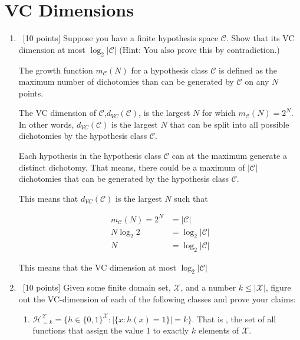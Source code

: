 \section{VC Dimensions}
\label{sec:vc-dimension}
\begin{enumerate}
\item ~[10 points] Suppose you have a finite hypothesis space
  $\mathcal{C}$. Show that its VC dimension at most
  $\log_2|\mathcal{C}|$ (Hint: You also prove this by contradiction.)

The growth function $m_\mathcal{C}(N)$ for a hypothesis class $\mathcal{C}$ is defined as the maximum number of dichotomies than can be generated by $\mathcal{C}$ on any $N$ points. 

The VC dimension of $\mathcal{C}$,$d_{VC}(\mathcal{C})$, is the largest $N$ for which $m_\mathcal{C}(N)=2^N$. In other words, $d_{VC}(\mathcal{C})$ is the largest $N$ that can be split into all possible dichotomies by the hypothesis class $\mathcal{C}$.

Each hypothesis in the hypothesis class $\mathcal{C}$ can at the maximum generate a distinct dichotomy. That means, there could be a maximum of $\left | \mathcal{C} \right| $ dichotomies that can be generated by the hypothesis class $\mathcal{C}$.

This means that $d_{VC}(\mathcal{C})$ is the largest $N$ such that 

\begin{equation*}
\begin{aligned}
m_\mathcal{C}(N)=2^N &= \left | \mathcal{C} \right| \\
N \log_2 2 &= \log_2 \left | \mathcal{C} \right| \\
N &= \log_2|\mathcal{C}|
\end{aligned}
\end{equation*}

This means that the VC dimension at most $\log_2|\mathcal{C}|$

\item ~[10 points] Given some finite domain set, $\mathcal{X}$, and a
  number $k \leq |\mathcal{X}|$, figure out the VC-dimension of each
  of the following classes and prove your claims:

  \begin{enumerate}
  \item
    $\mathcal{H}_{=k}^{\mathcal{X}} = \{h \in \{0,1\}^\mathcal{X} :
    |\{x : h(x) = 1\} | = k \}$. That is , the set of all functions that
    assign the value 1 to exactly $k$ elements of $\mathcal{X}$.


\end{enumerate}
\end{enumerate}
